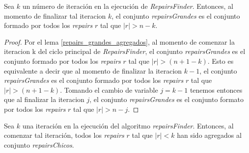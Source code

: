 \documentclass[11pt,a4paper,twoside]{tesis}
\begin{document}
\begin{lemma}\label{fin_iteracion_k_repairs}
Sea $k$ un número de iteración en la ejecución de \textit{RepairsFinder}. Entonces, al momento de finalizar tal iteracion $k$, el conjunto \textit{repairsGrandes} es el conjunto formado por todos los \textit{repairs} $r$ tal que $|r|>n-k$.
\end{lemma}

\begin{proof}
Por el lema \ref{repairs_grandes_agregados}, al momento de comenzar la iteracion k del ciclo principal de \textit{RepairsFinder}, el conjunto \textit{repairsGrandes} es el conjunto formado por todos los \textit{repairs} $r$ tal que $|r|>(n+ 1-k)$. Esto es equivalente a decir que al momento de finalizar la iteracion $k-1$, el conjunto \textit{repairsGrandes} es el conjunto formado por todos los  \textit{repairs} $r$ tal que $|r|>(n+ 1-k)$. Tomando el cambio de variable $j=k-1$ tenemos entonces que al finalizar la iteracion $j$, el conjunto \textit{repairsGrandes} es el conjunto formato por todos los \textit{repairs} $r$ tal que $|r|>n-j$.
\end{proof}


\begin{lemma}\label{lema_iteracion_k_repairsChicos}
Sea $k$ una iteración en la ejecución del algoritmo \textit{repairsFinder}. Entonces, al comenzar tal iteración, todos los \textit{repairs} $r$ tal que $|r| < k$ han sido agregados al conjunto \textit{repairsChicos}.
\end{lemma}
\end{document}

